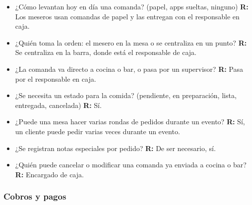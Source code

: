 \begin{itemize}
    \item ¿Cómo levantan hoy en día una comanda? (papel, apps sueltas, ninguno)
    \subitem \textbf{R:} Los meseros usan comandas de papel y las entregan con el responsable en caja.

    \item ¿Quién toma la orden: el mesero en la mesa o se centraliza en un punto?
    \subitem \textbf{R:} Se centraliza en la barra, donde está el responsable de caja.

    \item ¿La comanda va directo a cocina o bar, o pasa por un supervisor?
    \subitem \textbf{R:} Pasa por el responsable en caja.

    \item ¿Se necesita un estado para la comida? (pendiente, en preparación, lista, entregada, cancelada)
    \subitem \textbf{R:} Sí.

    \item ¿Puede una mesa hacer varias rondas de pedidos durante un evento?
    \subitem \textbf{R:} Sí, un cliente puede pedir varias veces durante un evento.

    \item ¿Se registran notas especiales por pedido?
    \subitem \textbf{R:} De ser necesario, sí.

    \item ¿Quién puede cancelar o modificar una comanda ya enviada a cocina o bar?
    \subitem \textbf{R:} Encargado de caja.
\end{itemize}

\subsubsection{Cobros y pagos}

